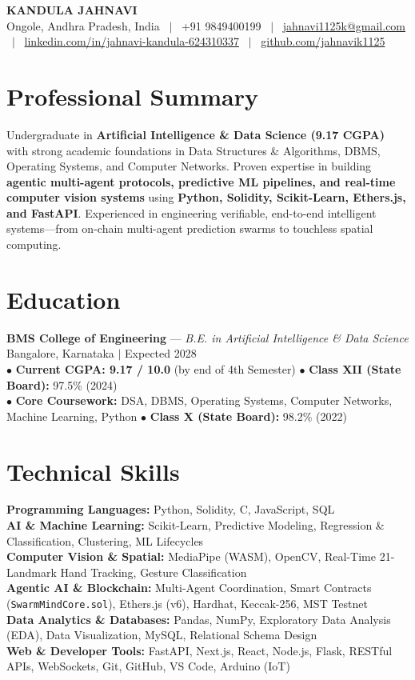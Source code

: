 \documentclass[a4paper,9.5pt]{article}
\begin{document}
\begin{center}
    {\LARGE \textbf{KANDULA JAHNAVI}}\\[2.5pt]
    \small Ongole, Andhra Pradesh, India \ $|$ \ +91 9849400199 \ $|$ \ \href{mailto:jahnavi1125k@gmail.com}{jahnavi1125k@gmail.com} \ $|$ \ \href{https://linkedin.com/in/jahnavi-kandula-624310337}{linkedin.com/in/jahnavi-kandula-624310337} \ $|$ \ \href{https://github.com/jahnavik1125}{github.com/jahnavik1125}
\end{center}

\section{Professional Summary}
\small Undergraduate in \textbf{Artificial Intelligence \& Data Science (9.17 CGPA)} with strong academic foundations in Data Structures \& Algorithms, DBMS, Operating Systems, and Computer Networks. Proven expertise in building \textbf{agentic multi-agent protocols, predictive ML pipelines, and real-time computer vision systems} using \textbf{Python, Solidity, Scikit-Learn, Ethers.js, and FastAPI}. Experienced in engineering verifiable, end-to-end intelligent systems---from on-chain multi-agent prediction swarms to touchless spatial computing.

\section{Education}
\small
\textbf{BMS College of Engineering} --- \textit{B.E. in Artificial Intelligence \& Data Science} \hfill Bangalore, Karnataka $|$ Expected 2028\\
$\bullet$ \textbf{Current CGPA: 9.17 / 10.0} (by end of 4th Semester) \hfill $\bullet$ \textbf{Class XII (State Board):} 97.5\% (2024)\\
$\bullet$ \textbf{Core Coursework:} DSA, DBMS, Operating Systems, Computer Networks, Machine Learning, Python \hfill $\bullet$ \textbf{Class X (State Board):} 98.2\% (2022)

\section{Technical Skills}
\small
\textbf{Programming Languages:} Python, Solidity, C, JavaScript, SQL\\
\textbf{AI \& Machine Learning:} Scikit-Learn, Predictive Modeling, Regression \& Classification, Clustering, ML Lifecycles\\
\textbf{Computer Vision \& Spatial:} MediaPipe (WASM), OpenCV, Real-Time 21-Landmark Hand Tracking, Gesture Classification\\
\textbf{Agentic AI \& Blockchain:} Multi-Agent Coordination, Smart Contracts (\texttt{SwarmMindCore.sol}), Ethers.js (v6), Hardhat, Keccak-256, MST Testnet\\
\textbf{Data Analytics \& Databases:} Pandas, NumPy, Exploratory Data Analysis (EDA), Data Visualization, MySQL, Relational Schema Design\\
\textbf{Web \& Developer Tools:} FastAPI, Next.js, React, Node.js, Flask, RESTful APIs, WebSockets, Git, GitHub, VS Code, Arduino (IoT)
\end{document}
